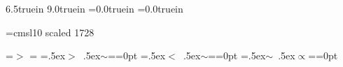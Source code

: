 %
\hsize 6.5truein
\vsize 9.0truein
\hoffset=0.0truein
\voffset=0.0truein

%
 
\font\bigslant =cmsl10 scaled 1728
%
%
\def\blankline{\par\vskip 12 pt\noindent}
\def\newline{\par\noindent}
\def\blankpar{\par\vskip 12 pt}
\def\refindent{\noindent\hangafter=1 \hangindent 24 pt}
\def\listlist{\advance\leftskip by1.5\parindent
  \everypar={\hangafter=1 \hangindent 54.0pt}}
\def\list{\advance\leftskip by0.5\parindent
  \everypar={\hangafter=1 \hangindent 36.0pt}}

%
\def\folio{\ifnum\pageno=1\nopagenumbers\else\number\pageno\fi}

%
\baselineskip 12.0pt
\parskip 8.0pt
\parindent 36.0pt

\raggedbottom
{}

%
\newbox\grsign \setbox\grsign=\hbox{$>$} \newdimen\grdimen \grdimen=\ht\grsign
\newbox\simlessbox \newbox\simgreatbox
\setbox\simgreatbox=\hbox{\raise.5ex\hbox{$>$}\llap
     {\lower.5ex\hbox{$\sim$}}}=\grdimen{}=0pt
\setbox\simlessbox=\hbox{\raise.5ex\hbox{$<$}\llap
     {\lower.5ex\hbox{$\sim$}}}=\grdimen{}=0pt
\def\simgreat{\mathrel{\copy\simgreatbox}}
\def\simless{\mathrel{\copy\simlessbox}}
\newbox\simppropto
\setbox\simppropto=\hbox{\raise.5ex\hbox{$\sim$}\llap
     {\lower.5ex\hbox{$\propto$}}}=\grdimen{}=0pt
\def\simpropto{\mathrel{\copy\simppropto}}

